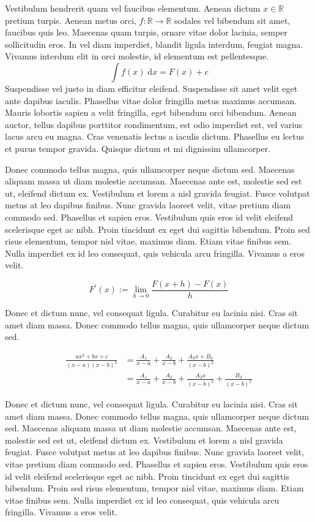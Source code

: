 Vestibulum hendrerit quam vel faucibus elementum. Aenean dictum  $x \in \mathbb{R}$ pretium turpis. Aenean metus orci, $f:\mathbb{R} \to \mathbb{R}$ sodales vel bibendum sit amet, faucibus quis leo. Maecenas quam turpis, ornare vitae dolor lacinia, semper sollicitudin eros. In vel diam imperdiet, blandit ligula interdum, feugiat magna. Vivamus interdum elit in orci molestie, id elementum est pellentesque. 
\[ \int f(x) \;\mathrm{d}x = F(x) + c \]
Suspendisse vel justo in diam efficitur eleifend. Suspendisse sit amet velit eget ante dapibus iaculis. Phasellus vitae dolor fringilla metus maximus accumsan. Mauris lobortis sapien a velit fringilla, eget bibendum orci bibendum. Aenean auctor, tellus dapibus porttitor condimentum, est odio imperdiet est, vel varius lacus arcu eu magna. Cras venenatis lectus a iaculis dictum. Phasellus eu lectus et purus tempor gravida. Quisque dictum et mi dignissim ullamcorper.

Donec commodo tellus magna, quis ullamcorper neque dictum sed. Maecenas \cite{dirac} aliquam massa ut diam molestie accumsan. Maecenas ante est, molestie sed est ut, eleifend dictum ex. Vestibulum et lorem a nisl gravida feugiat. Fusce volutpat metus at leo dapibus finibus. Nunc gravida laoreet velit, vitae pretium diam \cite{Nature2017} commodo sed. Phasellus et sapien eros. Vestibulum quis eros id velit eleifend scelerisque eget ac nibh. Proin tincidunt ex eget dui sagittis bibendum. Proin sed risus elementum, tempor nisl vitae, maximus diam. Etiam vitae finibus sem. Nulla imperdiet ex id leo consequat, quis vehicula arcu fringilla. Vivamus a eros velit.

\begin{equation}\label{eq:integration}
	F^{\prime}(x) := \lim_{h \to 0}\frac{F(x+h) - F(x)}{h}
\end{equation}

Donec et dictum nunc, vel consequat ligula. Curabitur eu lacinia nisi. Cras sit amet diam massa. Donec commodo tellus magna, quis ullamcorper neque dictum sed.

\begin{align*}
\frac{ax^2+bx+c}{(x-a)(x-b)^2}
& = \frac{A_1}{x-a} + \frac{A_2}{x-b} + \frac{A_3x+B_3}{(x-b)^2}
\\
& = \frac{A_1}{x-a} + \frac{A_2}{x-b} + \frac{A_3x}{(x-b)^2} + \frac{B_3}{(x-b)^2}
\end{align*}

Donec et dictum nunc, vel consequat ligula. Curabitur eu lacinia nisi. Cras sit amet diam massa. Donec commodo tellus magna, quis ullamcorper neque dictum sed. Maecenas aliquam massa ut diam molestie accumsan. Maecenas ante est, molestie sed est ut, eleifend dictum ex. Vestibulum et lorem a nisl gravida feugiat. Fusce volutpat metus at leo dapibus finibus. Nunc gravida laoreet velit, vitae pretium diam commodo sed. Phasellus et sapien eros. Vestibulum quis eros id velit eleifend scelerisque eget ac nibh. Proin tincidunt ex eget dui sagittis bibendum. Proin sed risus elementum, tempor nisl vitae, maximus diam. Etiam vitae finibus sem. Nulla imperdiet ex id leo consequat, quis vehicula arcu fringilla. Vivamus a eros velit.


